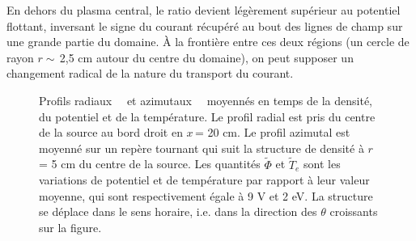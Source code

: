 \begin{refsection}
En dehors du plasma central, le ratio devient légèrement supérieur
au potentiel flottant, inversant le signe du courant récupéré au bout des lignes
de champ sur une grande partie du domaine. À la frontière entre ces
deux régions (un cercle de rayon $r\sim\,$2,5 cm autour du centre du domaine),
on peut supposer un changement radical de la nature du transport du courant.

\begin{figure}[!htbp]
  \centering
    \caption{Profils radiaux~~ et
    azimutaux~~ moyennés en temps de la densité, du
    potentiel et de la température. Le profil radial est pris du centre de la source au bord droit
    en $x\,$= 20 cm. Le profil azimutal est moyenné sur un repère tournant qui
    suit la structure de densité à $r\,$= 5 cm du centre de la source. Les
    quantités $\tilde{\Phi}$ et $\tilde{T}_e$ sont les variations de potentiel et de température par rapport à leur valeur
    moyenne, qui sont respectivement égale à 9 V et 2 eV. La structure se
    déplace dans le sens horaire, i.e. dans la direction des $\theta$ croissants
    sur la figure.}
    \label{4-CybeleProfils}
\end{figure}


\end{refsection}
